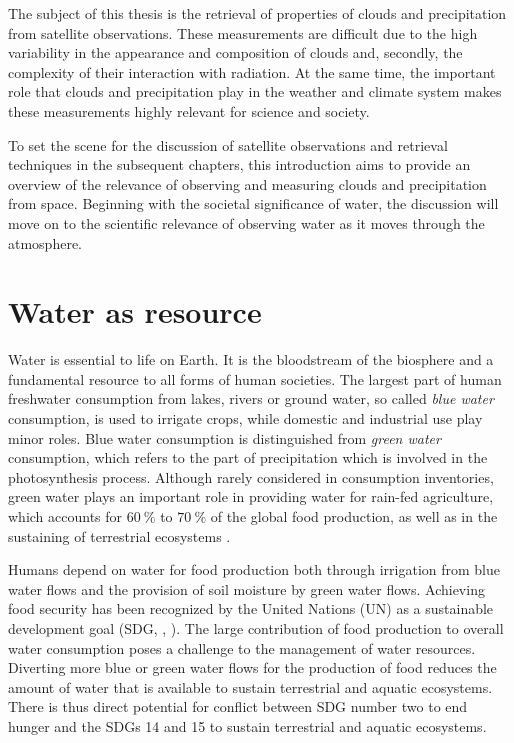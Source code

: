 The subject of this thesis is the retrieval of
properties of clouds and precipitation from satellite observations. These measurements are difficult
due to the high variability in the appearance and composition of clouds and,
secondly, the complexity of their interaction with radiation. At the
same time, the important role that clouds and precipitation play in the weather
and climate system makes these measurements highly relevant for science and
society.

To set the scene for the discussion of satellite observations and retrieval
techniques in the subsequent chapters, this introduction aims to provide an
overview of the relevance of observing and measuring clouds and precipitation
from space. Beginning with the societal significance of water, the discussion
will move on to the scientific relevance of observing water as it moves through
the atmosphere.



\section{Water as resource}

Water is essential to life on Earth. It is the bloodstream of the biosphere
\citep{falkenmark04} and a fundamental resource to all forms of human
societies. The largest part of human freshwater consumption from lakes, rivers
or ground water, so called \textit{blue water} consumption, is used to irrigate
crops, while domestic and industrial use play minor roles. Blue water
consumption is distinguished from \textit{green water} consumption, which refers
to the part of precipitation which is involved in the photosynthesis process.
Although rarely considered in consumption inventories, green water plays an
important role in providing water for rain-fed agriculture, which accounts for
$\SI{60}{\percent}$ to $\SI{70}{\percent}$ of the global food production, as
well as in the sustaining of terrestrial ecosystems \citep{falkenmark04}.

Humans depend on water for food production both through irrigation from
blue water flows and the provision of soil moisture by green water flows.
Achieving food security has been recognized by the United Nations (UN) as a
sustainable development goal (SDG, \citeauthor{sdg}, \citeyear{sdg}). The large
contribution of food production to overall water consumption poses a challenge
to the management of water resources. Diverting more blue or green water flows
for the production of food reduces the amount of water that is available to
sustain terrestrial and aquatic ecosystems. There is thus direct potential for
conflict between SDG number two to end hunger and the SDGs 14 and 15 to sustain
terrestrial and aquatic ecosystems.

